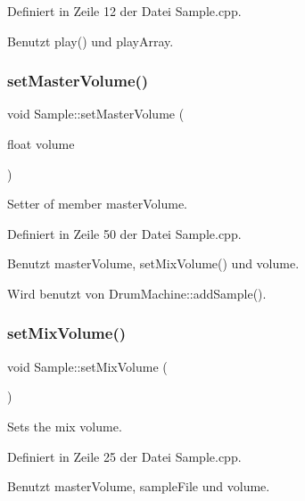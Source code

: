 Definiert in Zeile 12 der Datei Sample.\+cpp.



Benutzt play() und play\+Array.

\mbox{\label{class_sample_af8ad49b65a536c535393e3968516b871}} 
\subsubsection{\texorpdfstring{set\+Master\+Volume()}{setMasterVolume()}}
{\footnotesize\ttfamily void Sample\+::set\+Master\+Volume (\begin{DoxyParamCaption}\item[{float}]{volume }\end{DoxyParamCaption})}



Setter of member master\+Volume. 



Definiert in Zeile 50 der Datei Sample.\+cpp.



Benutzt master\+Volume, set\+Mix\+Volume() und volume.



Wird benutzt von Drum\+Machine\+::add\+Sample().

\mbox{\label{class_sample_a6d13988721d2190947f65969d4737a48}} 
\subsubsection{\texorpdfstring{set\+Mix\+Volume()}{setMixVolume()}}
{\footnotesize\ttfamily void Sample\+::set\+Mix\+Volume (\begin{DoxyParamCaption}{ }\end{DoxyParamCaption})\hspace{0.3cm}{\ttfamily [private]}}



Sets the mix volume. 



Definiert in Zeile 25 der Datei Sample.\+cpp.



Benutzt master\+Volume, sample\+File und volume.



